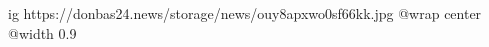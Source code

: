  
 
 
 
 

\ifcmt
  ig https://donbas24.news/storage/news/ouy8apxwo0sf66kk.jpg
  @wrap center
  @width 0.9
\fi
